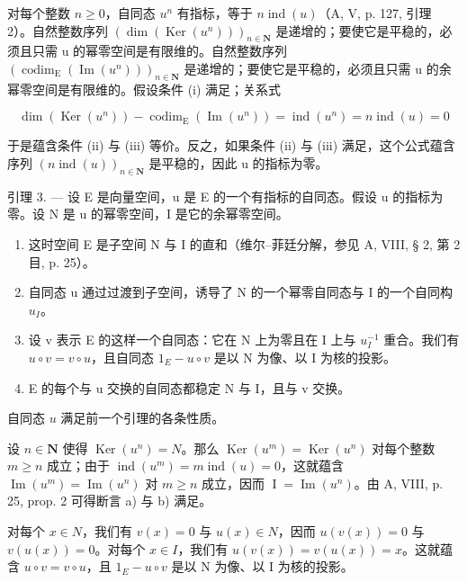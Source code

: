 对每个整数 \(n \geqslant 0\)，自同态 \(u^{n}\) 有指标，等于 \(n \operatorname{ind}(u)\)（A, V, p. 127, 引理 2）。自然整数序列 \((\dim(\operatorname{Ker}(u^{n})))_{n \in \mathbf{N}}\) 是递增的；要使它是平稳的，必须且只需 u 的幂零空间是有限维的。自然整数序列 \((\operatorname{codim}_{\operatorname{E}}(\operatorname{Im}(u^{n})))_{n \in \mathbf{N}}\) 是递增的；要使它是平稳的，必须且只需 u 的余幂零空间是有限维的。假设条件 (i) 满足；关系式

\[
\dim (\operatorname{Ker} (u ^ {n})) - \operatorname{codim} _ {\mathrm{E}} (\operatorname{Im} (u ^ {n})) = \operatorname{ind} (u ^ {n}) = n \operatorname{ind} (u) = 0
\]

于是蕴含条件 (ii) 与 (iii) 等价。反之，如果条件 (ii) 与 (iii) 满足，这个公式蕴含序列 \((n\operatorname{ind}(u))_{n\in\mathbf{N}}\) 是平稳的，因此 u 的指标为零。

引理 3. --- 设 E 是向量空间，u 是 E 的一个有指标的自同态。假设 u 的指标为零。设 N 是 u 的幂零空间，I 是它的余幂零空间。

\begin{enumerate}
\def\labelenumi{\alph{enumi})}
\item
  这时空间 E 是子空间 N 与 I 的直和（维尔--菲廷分解，参见 A, VIII, § 2, 第 2 目, p. 25）。
\item
  自同态 u 通过过渡到子空间，诱导了 N 的一个幂零自同态与 I 的一个自同构 \(u_{I}\)。
\item
  设 v 表示 E 的这样一个自同态：它在 N 上为零且在 I 上与 \(u_{I}^{-1}\) 重合。我们有 \(u \circ v = v \circ u\)，且自同态 \(1_{E} - u \circ v\) 是以 N 为像、以 I 为核的投影。
\item
  E 的每个与 u 交换的自同态都稳定 N 与 I，且与 v 交换。
\end{enumerate}

自同态 \(u\) 满足前一个引理的各条性质。

设 \(n \in \mathbf{N}\) 使得 \(\operatorname{Ker}(u^{n}) = N\)。那么 \(\operatorname{Ker}(u^{m}) = \operatorname{Ker}(u^{n})\) 对每个整数 \(m \geqslant n\) 成立；由于 \(\operatorname{ind}(u^{m}) = m \operatorname{ind}(u) = 0\)，这就蕴含 \(\operatorname{Im}(u^{m}) = \operatorname{Im}(u^{n})\) 对 \(m \geqslant n\) 成立，因而 \(\operatorname{I} = \operatorname{Im}(u^{n})\)。由 A, VIII, p. 25, prop. 2 可得断言 a) 与 b) 满足。

对每个 \(x \in N\)，我们有 \(v(x) = 0\) 与 \(u(x) \in N\)，因而 \(u(v(x)) = 0\) 与 \(v(u(x)) = 0\)。对每个 \(x \in I\)，我们有 \(u(v(x)) = v(u(x)) = x\)。这就蕴含 \(u \circ v = v \circ u\)，且 \(1_{E} - u \circ v\) 是以 N 为像、以 I 为核的投影。

